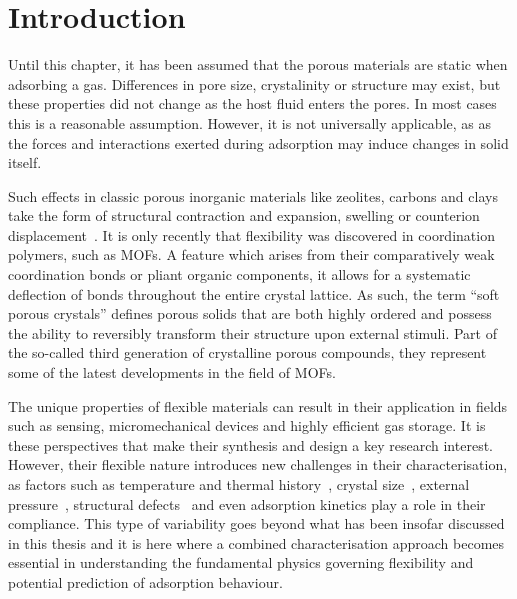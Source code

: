 
\section{Introduction}

Until this chapter, it has been assumed that the porous materials are 
static when adsorbing a gas. Differences in pore size, crystalinity 
or structure may exist, but these properties did not change
as the host fluid enters the pores.
In most cases this is a reasonable assumption. However, it is not 
universally applicable, as as the forces and interactions exerted 
during adsorption may induce changes in solid itself.

Such effects in classic porous inorganic materials like zeolites, carbons 
and clays take the form of structural contraction and expansion, swelling
or counterion displacement~\cite{coudertMolecularInsightCO2017}.
It is only recently that flexibility was discovered in coordination
polymers, such as MOFs. A feature which arises from 
their comparatively weak coordination bonds or pliant organic components,
it allows for a systematic deflection of bonds throughout the 
entire crystal lattice.
As such, the term ``soft porous crystals'' defines porous solids that are 
both highly ordered and possess the ability to reversibly transform
their structure upon external stimuli. Part of the so-called
third generation of crystalline porous compounds, they represent 
some of the latest developments in the field of MOFs.

The unique properties of flexible materials can result in
their application in fields such as sensing, micromechanical
devices and highly efficient gas storage. It is these perspectives
that make their synthesis and design a key research interest.
However, their flexible nature introduces new challenges in
their characterisation, as factors such as temperature and
thermal history~\cite{liuReversibleStructuralTransition2008},
crystal size~\cite{zhangCrystalSizeDependentStructuralTransitions2014, %
krauseEffectCrystalliteSize2018}, external 
pressure~\cite{itoReversiblePoreSize2013, %
chanutUsingExternalFactors2016}, structural defects~\cite{bennettInterplayDefectsDisorder2016} 
and even adsorption kinetics play a role in their compliance.
This type of variability goes beyond what has been insofar discussed
in this thesis and it is here where a combined characterisation approach
becomes essential in understanding the fundamental physics
governing flexibility and potential prediction of adsorption behaviour. 


